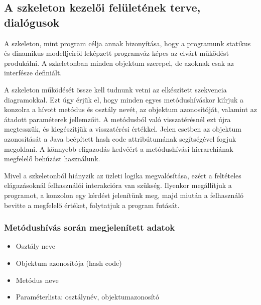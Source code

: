 \begin{enumerate}[label=\textbf{\arabic*.}, start=0]
		\end{enumerate}
	
	\subsection{A szkeleton kezelői felületének terve, dialógusok}
		A szkeleton, mint program célja annak bizonyítása, hogy a programunk statikus és dinamikus modelljeiről leképzett programváz képes az elvárt működést produkálni. A szkeletonban minden objektum szerepel, de azoknak csak az interfésze definiált.
		
		A szkeleton működését össze kell tudnunk vetni az elkészített szekvencia diagramokkal. Ezt úgy érjük el, hogy minden egyes metódushíváskor kiírjuk a konzolra a hívott metódus és osztály nevét, az objektum azonosítóját, valamint az átadott paraméterek jellemzőit. A metódusból való visszatérésnél ezt újra megtesszük, és kiegészítjük a visszatérési értékkel. Jelen esetben az objektum azonosítását a Java beépített hash code attribútumának segítségével fogjuk megoldani. A könnyebb eligazodás kedvéért a metódushívási hierarchiának megfelelő behúzást használunk.
		
		Mivel a szkeletonból hiányzik az üzleti logika megvalósítása, ezért a feltételes elágazásoknál felhasználói interakcióra van szükség. Ilyenkor megállítjuk a programot, a konzolon egy kérdést jelenítünk meg, majd miután a felhasználó bevitte a megfelelő értéket, folytatjuk a program futását.
		
		\subsubsection*{Metódushívás során megjelenített adatok}
			\begin{itemize}
				\item Osztály neve
				\item Objektum azonosítója (hash code)
				\item Metódus neve
				\item Paraméterlista: osztálynév, objektumazonosító
			\end{itemize}					
		
